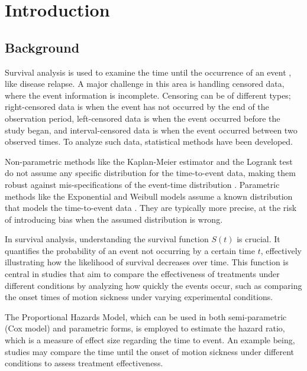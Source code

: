 \chapter{Introduction} %
\label{Chapter1} %

\section{Background}

\noindent Survival analysis is used to examine the time until the occurrence of an event \parencite{burzykowski_survival_2024}, like disease relapse. A major challenge in this area is handling censored data, where the event information is incomplete. Censoring can be of different types; right-censored data is when the event has not occurred by the end of the observation period, left-censored data is when the event occurred before the study began, and interval-censored data is when the event occurred between two observed times. To analyze such data, statistical methods have been developed.

Non-parametric methods like the Kaplan-Meier estimator and the Logrank test do not assume any specific distribution for the time-to-event data, making them robust against mis-specifications of the event-time distribution \parencite{burzykowski_survival_2024}. Parametric methods like the Exponential and Weibull models assume a known distribution that models the time-to-event data \noindent \parencite{burzykowski_survival_2024}. They are typically more precise, at the risk of introducing bias when the assumed distribution is wrong.

In survival analysis, understanding the survival function \( S(t)\) is crucial. It quantifies the probability of an event not occurring by a certain time \(t\), effectively illustrating how the likelihood of survival decreases over time. This function is central in studies that aim to compare the effectiveness of treatments under different conditions by analyzing how quickly the events occur, such as comparing the onset times of motion sickness under varying experimental conditions.

The Proportional Hazards Model, which can be used in both semi-parametric (Cox model) and parametric forms, is employed to estimate the hazard ratio, which is a measure of effect size regarding the time to event. An example being, studies may compare the time until the onset of motion sickness under different conditions to assess treatment effectiveness. 

